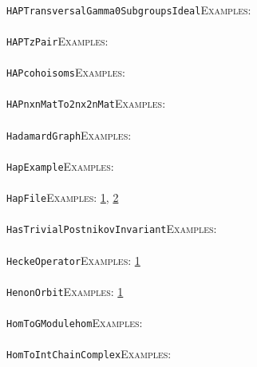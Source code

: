 \documentclass[a4paper,11pt]{report}
\begin{document}
{{ \\
 \texttt{HAP{\textunderscore}TransversalGamma0SubgroupsIdeal}{\nobreakspace}{\nobreakspace}{\nobreakspace}{\nobreakspace}\textsc{Examples:} \\
 \\
 \texttt{HAP{\textunderscore}TzPair}{\nobreakspace}{\nobreakspace}{\nobreakspace}{\nobreakspace}\textsc{Examples:} \\
 \\
 \texttt{HAP{\textunderscore}coho{\textunderscore}isoms}{\nobreakspace}{\nobreakspace}{\nobreakspace}{\nobreakspace}\textsc{Examples:} \\
 \\
 \texttt{HAP{\textunderscore}nxnMatTo2nx2nMat}{\nobreakspace}{\nobreakspace}{\nobreakspace}{\nobreakspace}\textsc{Examples:} \\
 \\
 \texttt{HadamardGraph}{\nobreakspace}{\nobreakspace}{\nobreakspace}{\nobreakspace}\textsc{Examples:} \\
 \\
 \texttt{HapExample}{\nobreakspace}{\nobreakspace}{\nobreakspace}{\nobreakspace}\textsc{Examples:} \\
 \\
 \texttt{HapFile}{\nobreakspace}{\nobreakspace}{\nobreakspace}{\nobreakspace}\textsc{Examples:} \href{tutorial/chap2.html} {1}{\nobreakspace}, \href{tutorial/chap4.html} {2}{\nobreakspace} \\
 \\
 \texttt{HasTrivialPostnikovInvariant}{\nobreakspace}{\nobreakspace}{\nobreakspace}{\nobreakspace}\textsc{Examples:} \\
 \\
 \texttt{HeckeOperator}{\nobreakspace}{\nobreakspace}{\nobreakspace}{\nobreakspace}\textsc{Examples:} \href{tutorial/chap10.html} {1}{\nobreakspace} \\
 \\
 \texttt{HenonOrbit}{\nobreakspace}{\nobreakspace}{\nobreakspace}{\nobreakspace}\textsc{Examples:} \href{tutorial/chap2.html} {1}{\nobreakspace} \\
 \\
 \texttt{HomToGModule{\textunderscore}hom}{\nobreakspace}{\nobreakspace}{\nobreakspace}{\nobreakspace}\textsc{Examples:} \\
 \\
 \texttt{HomToInt{\textunderscore}ChainComplex}{\nobreakspace}{\nobreakspace}{\nobreakspace}{\nobreakspace}\textsc{Examples:} \\
}}
\end{document}
